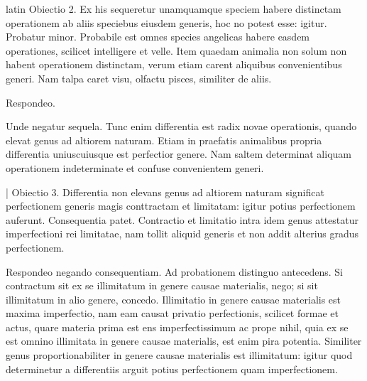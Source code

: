 \begin{otherlanguage*}{latin}
\pstart
Obiectio 2. Ex his sequeretur unamquamque speciem habere distinctam operationem ab aliis speciebus eiusdem generis, hoc no potest esse:
igitur. Probatur minor. Probabile est omnes species angelicas habere easdem operationes, scilicet intelligere et velle. Item quaedam animalia non solum non habent operationem distinctam, verum etiam carent aliquibus convenientibus generi. Nam talpa caret visu, olfactu pisces, similiter de aliis. 
\pend

\pstart
Respondeo.  
\pend

\pstart
Unde negatur sequela. Tunc enim differentia est radix novae operationis, quando elevat genus ad altiorem naturam. Etiam in praefatis animalibus propria differentia uniuscuiusque est perfectior genere. Nam saltem determinat aliquam operationem indeterminate et confuse convenientem generi. 
\pend

\pstart
\textnormal{|} Obiectio 3. Differentia non elevans genus ad altiorem naturam significat perfectionem generis magis conttractam et limitatam:
igitur potius perfectionem auferunt. Consequentia patet. Contractio et limitatio intra idem genus attestatur imperfectioni rei limitatae, nam tollit aliquid generis et non addit alterius gradus perfectionem. 
\pend

\pstart
Respondeo negando consequentiam. Ad probationem distinguo antecedens. Si contractum sit ex se illimitatum in genere causae materialis, nego; si sit illimitatum in alio genere, concedo. Illimitatio in genere causae materialis est maxima imperfectio, nam eam causat privatio perfectionis, scilicet formae et actus, quare materia prima est ens imperfectissimum ac prope nihil, quia ex se est omnino illimitata in genere causae materialis, est enim pira potentia. Similiter genus proportionabiliter in genere causae materialis est illimitatum:
igitur quod determinetur a differentiis arguit potius perfectionem quam imperfectionem. 
\pend


\end{otherlanguage*}
